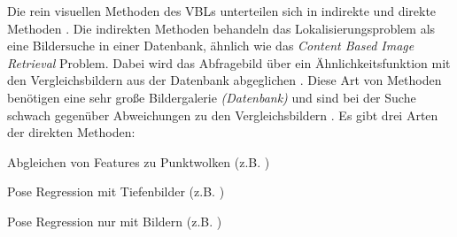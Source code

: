 Die rein visuellen Methoden des VBLs unterteilen sich in indirekte und direkte Methoden \cite{lowryVisualPlaceRecognition2016}. Die indirekten Methoden behandeln das Lokalisierungsproblem als eine Bildersuche in einer Datenbank, ähnlich wie das \textit{Content Based Image Retrieval} \cite{lewContentbasedMultimediaInformation2006} Problem. Dabei wird das Abfragebild über ein Ähnlichkeitsfunktion mit den Vergleichsbildern aus der Datenbank abgeglichen \cite{zhangImageBasedLocalization2006, arandjelovicThreeThingsEveryone2012, radenovicCNNImageRetrieval2016}. Diese Art von Methoden benötigen eine sehr große Bildergalerie \textit{(Datenbank)} und sind bei der Suche schwach gegenüber Abweichungen zu den Vergleichsbildern \cite{lowryVisualPlaceRecognition2016}. Es gibt drei Arten der direkten Methoden: 
\begin{enumerate*}[label=\arabic*)]
	\item Abgleichen von Features zu Punktwolken (z.B. \cite{liWorldwidePoseEstimation2012})
	\item Pose Regression mit Tiefenbilder (z.B. \cite{shottonSceneCoordinateRegression2013a})
	\item Pose Regression nur mit Bildern (z.B. \cite{kendallPoseNetConvolutionalNetwork2015})
\end{enumerate*}

